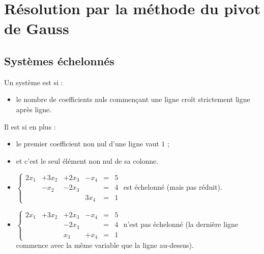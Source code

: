 \documentclass[class=report,crop=false]{standalone}
\begin{document}
\section{Résolution par la méthode du pivot de Gauss}

\subsection{Systèmes échelonnés}

\begin{definition}
Un système est  si :
\begin{itemize}
  \item le nombre de coefficients nuls commençant une ligne croît strictement ligne après ligne.
\end{itemize}

Il est  si en plus :
\begin{itemize}
\setcounter{enumi}{1}
  \item le premier coefficient non nul d'une ligne vaut $1$ ;

  \item et c'est le seul élément non nul de sa colonne.
\end{itemize}
\end{definition}


\begin{exemple}
\sauteligne
\begin{itemize}
  \item $\left\{\begin{array}{cccccc}
2x_1&+3x_2&+2x_3&-x_4&=&5\\
&-x_2&-2x_3&&=&4\\
&&&3x_4&=&1
\end{array}\right.
$ est échelonné (mais pas réduit).

  \item $\left\{\begin{array}{cccccc}
2x_1&+3x_2&+2x_3&-x_4&=&5\\
&&-2x_3&&=&4\\
&&x_3&+x_4&=&1
\end{array}\right.
$ n'est pas échelonné (la dernière ligne commence
avec la même variable que la ligne au-dessus).


\end{itemize}

\end{exemple}
\end{document}
